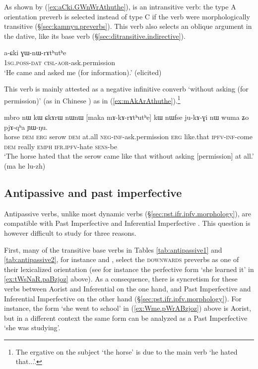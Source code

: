 As shown by (\ref{ex:aCki.GWnWrAthuthe}),  is an intransitive verb: the type A orientation preverb  is selected instead of type C if the verb were morphologically transitive (§\ref{sec:kamnyu.preverbs}). This verb also selects an oblique argument in the dative, like its base verb (§\ref{sec:ditransitive.indirective}).


\begin{exe}
\ex \label{ex:aCki.GWnWrAthuthe}
\gll  a-ɕki ɣɯ-nɯ-rɤtʰutʰe \\
\textsc{1sg}.\textsc{poss}-\textsc{dat} \textsc{cisl}-\textsc{aor}-ask.permission \\
\glt `He came and asked me (for information).' (elicited)
\end{exe}

This verb is mainly attested as a negative infinitive converb  `without asking (for permission)' (as in Chinese ) as in (\ref{ex:mAkArAthuthe}).\footnote{The ergative on the subject  `the horse' is due to the main verb  `he hated that...'. }

\begin{exe}
	\ex \label{ex:mAkArAthuthe}
	\gll mbro nɯ kɯ ɕkɤrɯ nɯnɯ [maka mɤ-kɤ-rɤtʰutʰe] kɯ nɯfse ju-kɤ-ɣi nɯ wuma ʑo pjɤ-qʰa ɲɯ-ŋu.  \\
	horse \textsc{dem} \textsc{erg} serow \textsc{dem} at.all \textsc{neg}-\textsc{inf}-ask.permission \textsc{erg} like.that \textsc{ipfv}-\textsc{inf}-come \textsc{dem} really \textsc{emph} \textsc{ifr}.\textsc{ipfv}-hate \textsc{sens}-be \\
	\glt `The horse hated that the serow came like that without asking [permission] at all.' (ma he lu-zh)
\end{exe} 

  \subsection{Antipassive and past imperfective} \label{sec:antipassive.pst.ipfv}
Antipassive verbs, unlike most dynamic verbs (§\ref{sec:pst.ifr.ipfv.morphology}), are compatible with Past Imperfective  and Inferential Imperfective . This question is however difficult to study for three reasons. 

First, many of the transitive base verbs in Tables \ref{tab:antipassive1} and \ref{tab:antipassive2}, for instance  and , select the \textsc{downwards} preverbs as one of their lexicalized orientation (see for instance the perfective form  `she learned it' in \ref{ex:tWsNaR.paBzjoz} above). As a consequence, there is syncretism for these verbs between Aorist and Inferential on the one hand, and Past Imperfective and Inferential Imperfective on the other hand (§\ref{sec:pst.ifr.ipfv.morphology}). For instance, the form  `she went to school' in (\ref{ex:Wme.pWrABzjoz}) above is Aorist, but in a different context the same form can be analyzed as a Past Imperfective `she was studying'.

